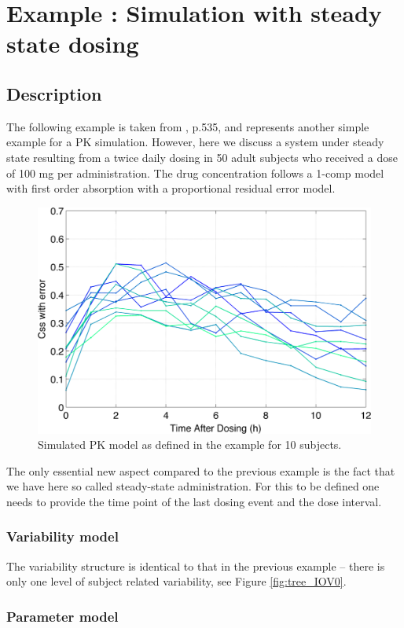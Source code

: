 \section{Example \theexamples: Simulation with steady state dosing}
\label{sec:eg2}

\subsection{Description}

The following example is taken from \cite{Bonate:2011fk}, p.535, and represents another simple example for a PK simulation. However, here we discuss a system under steady state resulting from a twice daily dosing in 50 adult subjects who received a dose of 100 mg per administration. The drug concentration follows a 1-comp model with first order absorption with a proportional residual error model.
\begin{figure}[ht!]
\begin{center}
\includegraphics[width=.45\textwidth]{pics/Bonate_Css_proportionalError}
\caption{Simulated PK model as defined in the example for 10 subjects.}
\label{fig:BonatePK}
\vspace{-20pt}
\end{center}
\end{figure}
The only essential new aspect compared to the previous example is the fact
that we have here so called steady-state administration. For this to be defined
one needs to provide the time point of the last dosing event and the dose interval.

\subsubsection{Variability model}
The variability structure is identical to that in the previous example -- there is only
one level of subject related variability, see Figure \ref{fig:tree_IOV0}.

\subsubsection{Parameter model}

